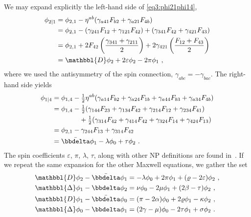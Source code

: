We may expand explicitly the left-hand side of \eqref{eq3:phi21phi14},
\begin{align}
    \label{eq3:phi21SpinCoef}
    \begin{split}
        \phi_{2\rvert 1} &= \phi_{2, 1} - \eta^{ab}( \gamma_{a41} F_{b2} + \gamma_{a21} F_{4b} ) \\
        &= \phi_{2, 1} - (\gamma_{241} F_{12} + \gamma_{121} F_{42}) + ( \gamma_{341} F_{42} + \gamma_{421} F_{43} ) \\
        &= \phi_{2, 1} + 2 F_{42} \left(\frac{\gamma_{341} + \gamma_{211}}{2}\right) + 2 \gamma_{421} \left(\frac{F_{12} + F_{43}}{2}\right) \\
        &= \mathbbl{D} \phi_2 + 2 \varepsilon \phi_2 - 2 \pi \phi_1 ~,
    \end{split}
\end{align}
where we used the antisymmetry of the spin connection, $\gamma_{abc}=-\gamma_{bac}$. The right-hand side yields
\begin{align}
    \label{eq3:phi21SpinCoef}
    \begin{split}
        \phi_{1\rvert 4} &= \phi_{1, 4} - \tfrac{1}{2} \eta^{ab}( \gamma_{a14} F_{b2} + \gamma_{a24} F_{1b} + \gamma_{a44} F_{b3} + \gamma_{a34} F_{4b} ) \\
        &= \phi_{1, 4} - \tfrac{1}{2} ( \gamma_{144} F_{23} + \gamma_{134} F_{42} + \gamma_{214} F_{12} + \gamma_{234} F_{41} ) \\ 
        &\qquad\qquad + \tfrac{1}{2} ( \gamma_{314} F_{42} + \gamma_{414} F_{42} + \gamma_{324} F_{14} + \gamma_{424} F_{13} ) \\
        &= \phi_{2, 1} - \gamma_{244} F_{13} + \gamma_{314} F_{42} \\
        &= \bar{\bbdelta} \phi_1 - \lambda \phi_0 + \tau \phi_2  ~.
    \end{split}
\end{align}
The spin coefficients $\varepsilon$, $\pi$, $\lambda$, $\tau$, along with other NP definitions are found in~. If we repeat the same expansion for the other Maxwell equations, we gather the set
\begin{subequations}
    \begin{align}
        \label{eq3:phi21phi14SpinCoef}
        \mathbbl{D} \phi_2 - \bar{\bbdelta} \phi_1 &= -\lambda \phi_0 + 2 \pi \phi_1 + (\varrho - 2 \varepsilon) \phi_2 ~,\\
        \label{eq3:phi12phi23SpinCoef}
        \mathbbl{\Delta} \phi_1 - \bbdelta \phi_2 &= \nu \phi_0 - 2 \mu \phi_1 + (2\beta-\tau) \phi_2 ~,\\
        \label{eq3:phi11phi04SpinCoef}
        \mathbbl{D} \phi_1 - \bar{\bbdelta} \phi_0 &= (\pi - 2 \alpha) \phi_0 + 2 \varrho \phi_1 - \kappa \phi_2 ~,\\
        \label{eq3:phi02phi13SpinCoef}
        \mathbbl{\Delta} \phi_0 - \bbdelta \phi_1 &= (2 \gamma - \mu) \phi_0 - 2 \tau \phi_1 + \sigma \phi_2 ~.
    \end{align}
\end{subequations}
